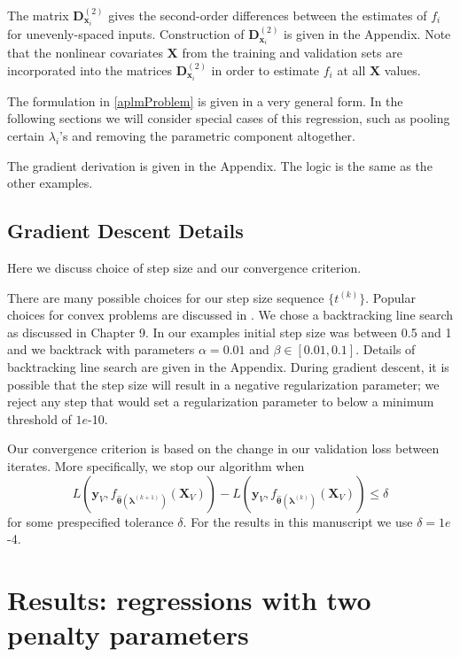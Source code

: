 \documentclass{statsoc}
\begin{document}
The matrix $\boldsymbol{D}^{(2)}_{\boldsymbol{x}_i}$ gives the second-order differences between the estimates of $f_i$ for unevenly-spaced inputs. Construction of $\boldsymbol{D}^{(2)}_{\boldsymbol{x}_i}$ is given in the Appendix. Note that the nonlinear covariates $\boldsymbol X$ from the training and validation sets are incorporated into the matrices $\boldsymbol{D}^{(2)}_{\boldsymbol{x}_i}$ in order to estimate $f_i$ at all $\boldsymbol X$ values.

The formulation in \eqref{aplmProblem} is given in a very general form. In the following sections we will consider special cases of this regression, such as pooling certain $\lambda_i$'s and removing the parametric component altogether.

The gradient derivation is given in the Appendix. The logic is the same as the other examples.

\subsection{Gradient Descent Details}\label{sec:alg_details}
Here we discuss choice of step size and our convergence criterion.

There are many possible choices for our step size sequence $\{t^{(k)}\}$. Popular choices for convex problems are discussed in \citet{boyd2004convex}. We chose a backtracking line search as discussed in Chapter 9. In our examples initial step size was between 0.5 and 1 and we backtrack with parameters $\alpha = 0.01$ and $\beta \in [0.01, 0.1]$. Details of backtracking line search are given in the Appendix. During gradient descent, it is possible that the step size will result in a negative regularization parameter; we reject any step that would set a regularization parameter to below a minimum threshold of $1e$-10.

Our convergence criterion is based on the change in our validation loss between iterates. More specifically, we stop our algorithm when
\[
L \left( \boldsymbol{y}_V, f_{\hat{\boldsymbol \theta}(\boldsymbol{\lambda}^{(k+1)})}(\boldsymbol{X}_V)\right) -
L \left( \boldsymbol{y}_V, f_{\hat{\boldsymbol \theta}(\boldsymbol{\lambda}^{(k)})}(\boldsymbol{X}_V)\right) \leq \delta
\]
for some prespecified tolerance $\delta$. For the results in this manuscript we use $\delta = 1e$-4.

\section{Results: regressions with two penalty parameters}\label{sec:results1}\label{results1}
\end{document}
